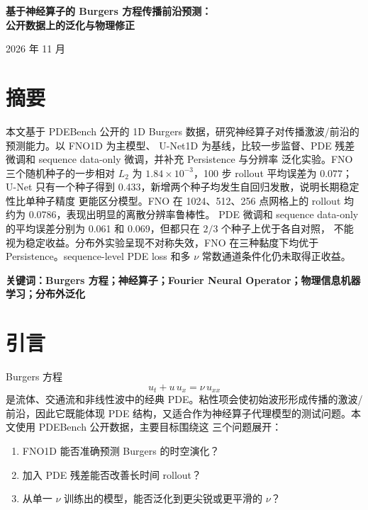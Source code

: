 \documentclass[a4paper,11pt,fontset=windows]{ctexart}
\begin{document}
\begin{center}
  {\LARGE\bfseries 基于神经算子的 Burgers 方程传播前沿预测：\\[2pt]
   公开数据上的泛化与物理修正\par}
  \vspace{10pt}
  {\small\color{gray} 2026 年 11 月\par}
\end{center}

\vspace{6pt}

\section*{摘要}

本文基于 PDEBench 公开的 1D Burgers 数据，研究神经算子对传播激波/前沿的预测能力。以 FNO1D 为主模型、
U-Net1D 为基线，比较一步监督、PDE 残差微调和 sequence data-only 微调，并补充 Persistence 与分辨率
泛化实验。FNO 三个随机种子的一步相对 $L_2$ 为 $1.84\times10^{-3}$，100 步 rollout 平均误差为
$0.077$；U-Net 只有一个种子得到 0.433，新增两个种子均发生自回归发散，说明长期稳定性比单种子精度
更能区分模型。FNO 在 1024、512、256 点网格上的 rollout 均约为 0.0786，表现出明显的离散分辨率鲁棒性。
PDE 微调和 sequence data-only 的平均误差分别为 0.061 和 0.069，但都只在 $2/3$ 个种子上优于各自对照，
不能视为稳定收益。分布外实验呈现不对称失效，FNO 在三种黏度下均优于 Persistence。sequence-level PDE
loss 和多 $\nu$ 常数通道条件化仍未取得正收益。

\vspace{4pt}
\noindent\textbf{关键词：Burgers 方程；神经算子；Fourier Neural Operator；物理信息机器学习；分布外泛化}

\section{引言}

Burgers 方程
\begin{equation}
  u_t + u\,u_x = \nu\,u_{xx}
\end{equation}
是流体、交通流和非线性波中的经典 PDE。粘性项会使初始波形形成传播的激波/前沿，因此它既能体现
PDE 结构，又适合作为神经算子代理模型的测试问题。本文使用 PDEBench 公开数据，主要目标围绕这
三个问题展开：

\begin{enumerate}
  \item FNO1D 能否准确预测 Burgers 的时空演化？
  \item 加入 PDE 残差能否改善长时间 rollout？
  \item 从单一 $\nu$ 训练出的模型，能否泛化到更尖锐或更平滑的 $\nu$？
\end{enumerate}
\end{document}
